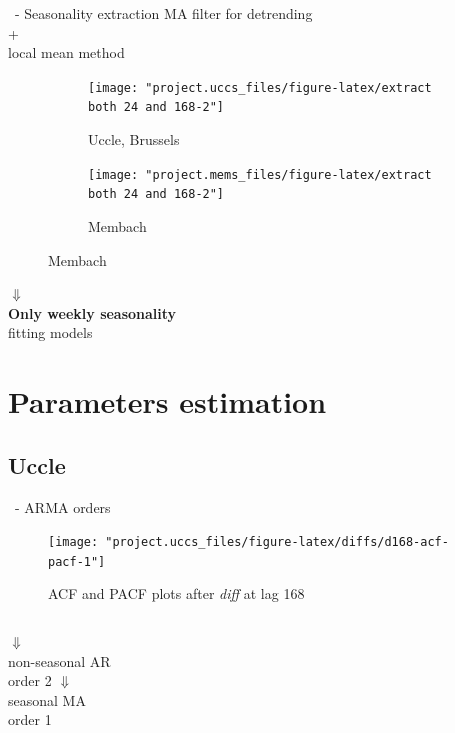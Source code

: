 \documentclass{beamer}
\begin{document}
\begin{frame}{\subsecname~- Seasonality extraction}
	\centering MA filter for detrending\\+\\local mean method%
	\begin{figure}
		\begin{subfigure}{.49\linewidth}
			\texttt{[image: "project.uccs\_files/figure-latex/extract both 24 and 168-2"]}
			\caption{Uccle, Brussels}
		\end{subfigure}
		\begin{subfigure}{.49\linewidth}
			\texttt{[image: "project.mems\_files/figure-latex/extract both 24 and 168-2"]}
			\caption{Membach}
		\end{subfigure}
	\end{figure}
	\large$\Downarrow$\\
	\normalsize\textbf{Only weekly seasonality}\\\small fitting models
\end{frame}

\section{Parameters estimation}
\subsection{Uccle}

\begin{frame}{\subsecname~- ARMA orders}
	\begin{figure}[h]
		\centering
		\caption{ACF and PACF plots after \textit{diff} at lag 168}
		\texttt{[image: "project.uccs\_files/figure-latex/diffs/d168-acf-pacf-1"]}
	\end{figure}
	\begin{columns}
		\centering
		$\Downarrow$\\
		non-seasonal AR\\
		order 2
		\centering
		$\Downarrow$\\
		seasonal MA\\
		order 1
	\end{columns}~\\~
\end{frame}
\end{document}

